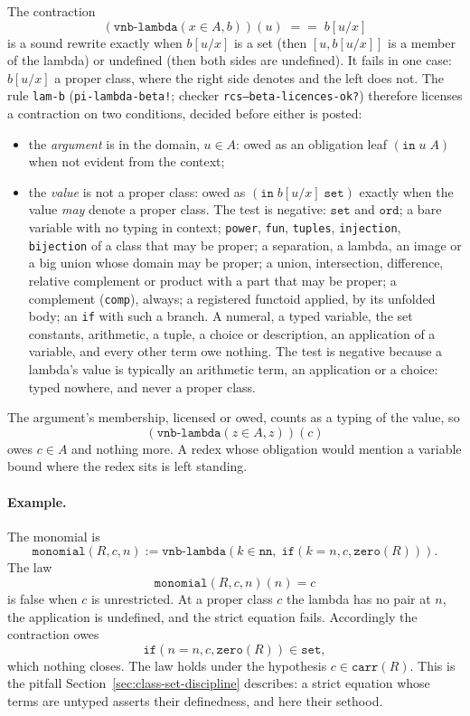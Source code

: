 The contraction
\[
  (\texttt{vnb-lambda}(x \in A, b))(u) \;==\; b[u/x]
\]
is a sound rewrite exactly when $b[u/x]$ is a set (then $[u, b[u/x]]$ is a member of the
lambda) or undefined (then both sides are undefined).  It fails in one
case: $b[u/x]$ a proper class, where the right side denotes and the left
does not.  The rule \texttt{lam-b} (\texttt{pi-lambda-beta!}; checker
\texttt{rcs--beta-licences-ok?}) therefore licenses a contraction on two
conditions, decided before either is posted:
\begin{itemize}
\item the \emph{argument} is in the domain, $u \in A$: owed as an
  obligation leaf $(\mathtt{in}\; u\; A)$ when not evident from the context;
\item the \emph{value} is not a proper class: owed as
  $(\mathtt{in}\; b[u/x]\; \mathtt{set})$ exactly when the value \emph{may}
  denote a proper class.  The test is negative: $\mathtt{set}$ and
  $\mathtt{ord}$; a bare variable with no typing in context; \texttt{power},
  \texttt{fun}, \texttt{tuples}, \texttt{injection}, \texttt{bijection} of a
  class that may be proper; a separation, a lambda, an image or a big union
  whose domain may be proper; a union, intersection, difference, relative
  complement or product with a part that may be proper; a complement
  (\texttt{comp}), always; a registered functoid applied, by its unfolded
  body; an \texttt{if} with such a branch.  A numeral, a
  typed variable, the set constants, arithmetic, a tuple, a choice or
  description, an application of a variable, and every other term owe
  nothing.  The test is negative because a lambda's value is typically
  an arithmetic term, an application or a choice: typed nowhere, and
  never a proper class.
\end{itemize}
The argument's membership, licensed or owed, counts as a typing of the
value, so
\[
  (\texttt{vnb-lambda}(z \in A, z))(c)
\]
owes $c \in A$ and nothing more.  A redex whose obligation would mention a variable bound where the
redex sits is left standing.

\paragraph{Example.}  The monomial is
\[
  \texttt{monomial}(R, c, n) := \texttt{vnb-lambda}(k \in \mathtt{nn},\;
  \texttt{if}(k = n, c, \mathtt{zero}(R))).
\]
The law
\[
  \texttt{monomial}(R, c, n)(n) = c
\]
is false when $c$ is unrestricted.  At a proper class $c$ the lambda has
no pair at $n$, the application is undefined, and the strict equation
fails.  Accordingly the contraction owes
\[
  \texttt{if}(n = n, c, \mathtt{zero}(R)) \in \mathtt{set},
\]
which nothing closes.  The law holds under the hypothesis
$c \in \mathtt{carr}(R)$.  This is the pitfall
Section~\ref{sec:class-set-discipline} describes: a strict equation whose
terms are untyped asserts their definedness, and here their sethood.

